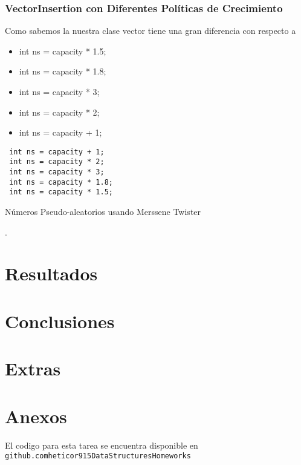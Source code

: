 \documentclass[paper=a4, fontsize=12pt]{article} 		%
\numberwithin{equation}{section}						%
\numberwithin{table}{section} 							%
\begin{document}
\subsubsection{VectorInsertion con Diferentes Políticas de Crecimiento}
Como sabemos la nuestra clase vector tiene una gran diferencia con respecto a 
\begin{itemize}
\item  int ns = capacity * 1.5;
\item  int ns = capacity * 1.8;
\item  int ns = capacity * 3;
\item int ns = capacity * 2;
\item int ns = capacity + 1;

\end{itemize} 

\begin{listing}[H]
	\begin{verbatim}
 int ns = capacity + 1;
 int ns = capacity * 2;
 int ns = capacity * 3;
 int ns = capacity * 1.8;
 int ns = capacity * 1.5;
\end{verbatim}
\caption{Números Pseudo-aleatorios usando Merssene Twister}.
    \label{2nd:the-code}
\end{listing}





\section{Resultados}

\section{Conclusiones}

\section{Extras}
\section{Anexos}
El codigo para esta tarea se encuentra disponible en \texttt{github.com\/heticor915\/DataStructures\/Homeworks\/}
\end{document}
